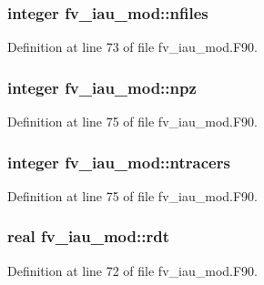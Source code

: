 \subsubsection[{nfiles}]{\setlength{\rightskip}{0pt plus 5cm}integer fv\-\_\-iau\-\_\-mod\-::nfiles\hspace{0.3cm}{\ttfamily [private]}}\label{classfv__iau__mod_a756fe43c3f4a450d555fc78eef47d82d}


Definition at line 73 of file fv\-\_\-iau\-\_\-mod.\-F90.

\subsubsection[{npz}]{\setlength{\rightskip}{0pt plus 5cm}integer fv\-\_\-iau\-\_\-mod\-::npz\hspace{0.3cm}{\ttfamily [private]}}\label{classfv__iau__mod_aaf9ea7c9b134626a73380e7fdd86e42d}


Definition at line 75 of file fv\-\_\-iau\-\_\-mod.\-F90.

\subsubsection[{ntracers}]{\setlength{\rightskip}{0pt plus 5cm}integer fv\-\_\-iau\-\_\-mod\-::ntracers\hspace{0.3cm}{\ttfamily [private]}}\label{classfv__iau__mod_a024c7a7ef109d8c660c3df5faf6746f4}


Definition at line 75 of file fv\-\_\-iau\-\_\-mod.\-F90.

\subsubsection[{rdt}]{\setlength{\rightskip}{0pt plus 5cm}real fv\-\_\-iau\-\_\-mod\-::rdt\hspace{0.3cm}{\ttfamily [private]}}\label{classfv__iau__mod_a60ee6932472e1de9516db019295fd7d1}


Definition at line 72 of file fv\-\_\-iau\-\_\-mod.\-F90.

